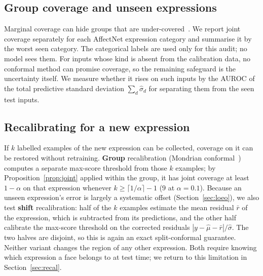 \subsection{Group coverage and unseen expressions}
Marginal coverage can hide groups that are under-covered~\cite{romano2020malice}.
We report joint coverage separately for each AffectNet expression category and
summarise it by the worst seen category. The categorical labels are used only for
this audit; no model sees them. For inputs whose kind is absent from the
calibration data, no conformal method can promise coverage, so the remaining
safeguard is the uncertainty itself. We measure whether it rises on such inputs by
the AUROC of the total predictive standard deviation
$\sum_d\hat\sigma_d$ for separating them from the seen test inputs.

\subsection{Recalibrating for a new expression}
\label{sec:recal-method}
If $k$ labelled examples of the new expression can be collected, coverage on it
can be restored without retraining. \textbf{Group} recalibration (Mondrian
conformal~\cite{vovk2012conditional}) computes a separate max-score threshold
from those $k$ examples; by Proposition~\ref{prop:joint} applied within the
group, it has joint coverage at least $1-\alpha$ on that expression whenever
$k\ge\lceil 1/\alpha\rceil-1$ ($9$ at $\alpha=0.1$). Because an unseen
expression's error is largely a systematic offset (Section~\ref{sec:loeo}), we
also test \textbf{shift} recalibration: half of the $k$ examples estimate the
mean residual $\bar r$ of the expression, which is subtracted from its
predictions, and the other half calibrate the max-score threshold on the
corrected residuals $|y-\hat\mu-\bar r|/\hat\sigma$. The two halves are
disjoint, so this is again an exact split-conformal guarantee. Neither variant
changes the region of any other expression. Both require knowing which
expression a face belongs to at test time; we return to this limitation in
Section~\ref{sec:recal}.
